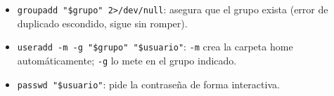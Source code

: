 \begin{itemize}
  \item \texttt{groupadd "\$grupo" 2>/dev/null}: asegura que el grupo exista (error de duplicado escondido, sigue sin romper).
  \item \texttt{useradd -m -g "\$grupo" "\$usuario"}: \texttt{-m} crea la carpeta home automáticamente; \texttt{-g} lo mete en el grupo indicado.
  \item \texttt{passwd "\$usuario"}: pide la contraseña de forma interactiva.
\end{itemize}